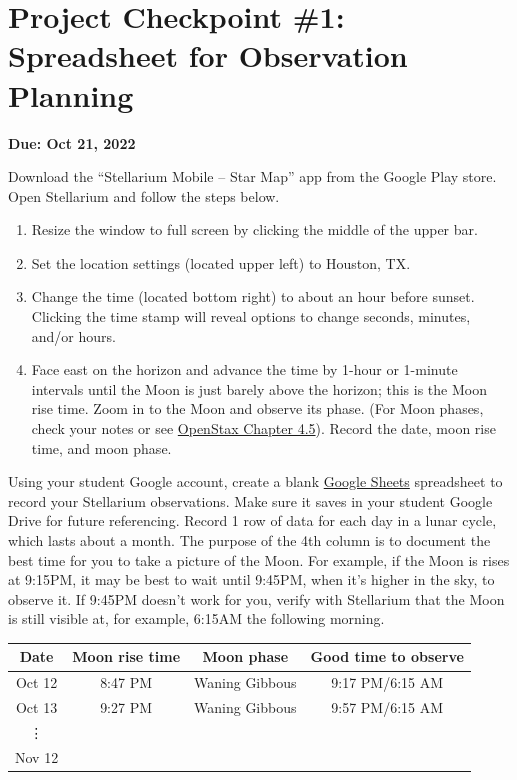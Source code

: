 \documentclass{article}
\begin{document}
\section*{Project Checkpoint \#1: Spreadsheet for Observation Planning}

\textbf{Due: Oct 21, 2022}

Download the ``Stellarium Mobile -- Star Map'' app from the Google Play store. Open Stellarium and follow the steps below.

\begin{enumerate}
\setlength\itemsep{0ex}
    \item Resize the window to full screen by clicking the middle of the upper bar.
    \item Set the location settings (located upper left) to Houston, TX.
    \item Change the time (located bottom right) to about an hour before sunset. Clicking the time stamp will reveal options to change seconds, minutes, and/or hours.
    \item Face east on the horizon and advance the time by 1-hour or 1-minute intervals until the Moon is just barely above the horizon; this is the Moon rise time. Zoom in to the Moon and observe its phase. (For Moon phases, check your notes or see \href{https://openstax.org/books/astronomy-2e/pages/4-5-phases-and-motions-of-the-moon}{OpenStax Chapter 4.5}).
    Record the date, moon rise time, and moon phase.    
\end{enumerate} 

Using your student Google account, create a blank \href{https://www.google.com/sheets/about/}{Google Sheets}  spreadsheet to record your Stellarium observations. Make sure it saves in your student Google Drive for future referencing. Record 1 row of data for each day in a lunar cycle, which lasts about a month. The purpose of the 4th column is to document the best time for you to take a picture of the Moon. For example, if the Moon is rises at 9:15PM, it may be best to wait until 9:45PM, when it's higher in the sky, to observe it. If 9:45PM doesn't work for you, verify with Stellarium that the Moon is still visible at, for example, 6:15AM the following morning.

\begin{center}
\begin{tabular}{c|c|c|c}
    \textbf{Date} & \textbf{Moon rise time} & \textbf{Moon phase} & \textbf{Good time to observe} \\
    \hline
    Oct 12 & 8:47 PM & Waning Gibbous & 9:17 PM/6:15 AM\\ 
    Oct 13 & 9:27 PM & Waning Gibbous & 9:57 PM/6:15 AM\\
    \vdots & & & \\
    Nov 12 & & & \\
\end{tabular}
\end{center}
\end{document}

